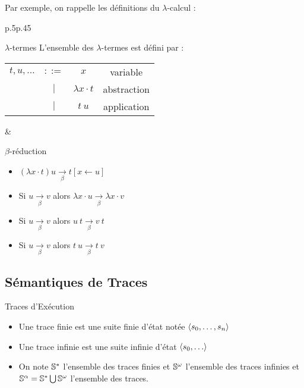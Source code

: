 \documentclass{cours}
\begin{document}
Par exemple, on rappelle les définitions du $\lambda$-calcul :\\\vspace{5pt}
\begin{tabular}{p{.5\linewidth}p{.45\linewidth}}
    \begin{définition}{$\lambda$-termes}{}
        L'ensemble des $\lambda$-termes est défini par :\vspace{10pt}
        \begin{tabular}{>{$}c<{$}>{$}c<{$}>{$}c<{$}c}
            t, u, \dots & ::= & x & variable\vspace{3pt}\\
            & | & \lambda x\cdot t & abstraction\vspace{3pt}\\
            & | & t\ u & application\vspace{3pt}
        \end{tabular}
    \end{définition}
    & \begin{définition}{$\beta$-réduction}{}
        \vspace{-3pt}
        \begin{itemize}
            \item $(\lambda x \cdot t) u \xrightarrow[\beta]{} t[x \leftarrow u]$\vspace{-3pt}
            \item Si $u \xrightarrow[\beta]{} v$ alors $\lambda x \cdot u \xrightarrow[\beta]{} \lambda x \cdot v$\vspace{-3pt}
            \item Si $u \xrightarrow[\beta]{} v$ alors $u\ t \xrightarrow[\beta]{} v\ t$\vspace{-3pt}
            \item Si $u \xrightarrow[\beta]{} v$ alors $t\ u \xrightarrow[\beta]{} t\ v$\vspace{-4pt}
        \end{itemize}
    \end{définition}
\end{tabular}
\vspace{-12pt}
\subsection{Sémantiques de Traces}
\begin{définition}{Traces d'Exécution}{}
    \begin{itemize}
        \item Une trace finie est une suite finie d'état notée $\scalar{s_{0}, \ldots, s_{n}}$
        \item Une trace infinie est une suite infinie d'état $\scalar{s_{0},\ldots}$
        \item On note $\S^{*}$ l'ensemble des traces finies et $\S^{\omega}$ l'ensemble des traces infinies et $\S^{\alpha} = \S^{*} \bigcup \S^{\omega}$ l'ensemble des traces.
    \end{itemize}
\end{définition}
\end{document}
